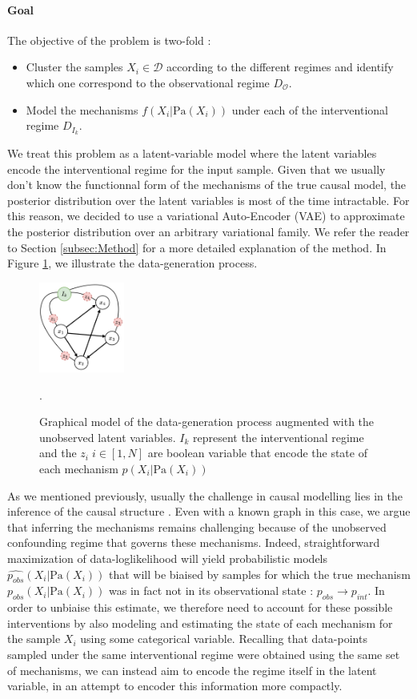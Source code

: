 \documentclass{article}
\begin{document}
\paragraph{Goal}The objective of the problem is two-fold :
\begin{itemize}
    \item Cluster the samples $X_i \in \mathcal{D}$ according to the different regimes
          and identify which one correspond to the observational regime
          $D_{\mathcal{O}}$.
    \item Model the mechanisms $f(X_i | \text{Pa}(X_i))$ under each of the interventional
          regime $D_{I_k}$.
\end{itemize}
We treat this problem as a latent-variable model where the latent variables encode the interventional regime for the input sample. Given that we usually don't know the functionnal form of the mechanisms of the true causal model, the posterior distribution over the latent variables is most of the time intractable. For this reason, we decided to use a variational Auto-Encoder (VAE) to approximate the posterior distribution over an arbitrary variational family. We refer the reader to Section \ref{subsec:Method} for a more detailed explanation of the method. In Figure \ref{fig:DAG}, we illustrate the data-generation process.
\begin{figure}
    \centering
    \includegraphics[width=0.25\textwidth]{images/DAG.pdf}
    \caption{Graphical model of the data-generation process augmented with the unobserved latent variables. $I_k$ represent the interventional regime and the $z_i \; i \in [1,N]$ are boolean variable that encode the state of each mechanism $p(X_i | \text{Pa}(X_i))$}.
    \label{fig:DAG}
\end{figure}

As we mentioned previously, usually the challenge in causal modelling lies in
the inference of the causal structure
\cite{brouillard2020differentiablecausaldiscoveryinterventional,
    lorch2022amortizedinferencecausalstructure}. Even with a known graph in this
case, we argue that inferring the mechanisms remains challenging because of the
unobserved confounding regime that governs these mechanisms. Indeed,
straightforward maximization of data-loglikelihood will yield probabilistic
models $\hat{p_{obs}}(X_i | \text{Pa}(X_i))$ that will be biaised by samples
for which the true mechanism $p_{obs}(X_i | \text{Pa}(X_i))$ was in fact not in
its observational state : $p_{obs} \rightarrow p_{int}$. In order to unbiaise
this estimate, we therefore need to account for these possible interventions by
also modeling and estimating the state of each mechanism for the sample $X_i$
using some categorical variable. Recalling that data-points sampled under the
same interventional regime were obtained using the same set of mechanisms, we
can instead aim to encode the regime itself in the latent variable, in an
attempt to encoder this information more compactly.
\end{document}
